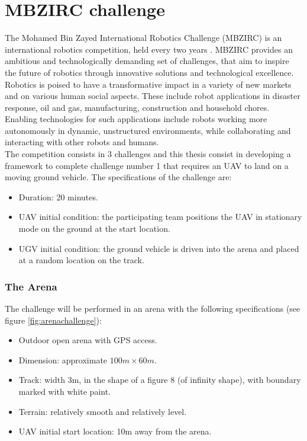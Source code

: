 \chapter{MBZIRC challenge}\label{chap:thechallenge}
The Mohamed Bin Zayed International Robotics Challenge (MBZIRC) is an international robotics competition, held every two years \cite{challenge_description}. MBZIRC provides an ambitious and technologically demanding set of challenges, that aim to inspire the future of robotics through innovative solutions and technological excellence.\\
Robotics is poised to have a transformative impact in a variety of new markets and on various human social aspects. These include robot applications in disaster response, oil and gas, manufacturing, construction and household chores. Enabling technologies for such applications include robots working more autonomously in dynamic, unstructured environments, while collaborating and interacting with other robots and humans. \\
The competition consists in 3 challenges and this thesis consist in developing a framework to complete challenge number 1 that requires an UAV to land on a moving ground vehicle. 
The specifications of the challenge are:
\begin{itemize}
\item Duration: 20 minutes.
\item UAV initial condition: the participating team positions the UAV in stationary mode on the ground at the start location.
\item UGV initial condition: the ground vehicle is driven into the arena and placed at a random location on the track.
\end{itemize}

 

\subsection{The Arena}
The challenge will be performed in an arena with the following specifications (see figure \ref{fig:arenachallenge}):
\begin{itemize}
\item Outdoor open arena with GPS access.
\item Dimension: approximate  $100m \times 60m$.
\item Track: width 3m, in the shape of a figure 8 (of infinity shape), with boundary marked with white paint.
\item Terrain: relatively smooth and relatively level. 
\item UAV initial start location: 10m away from the arena.
\end{itemize}

